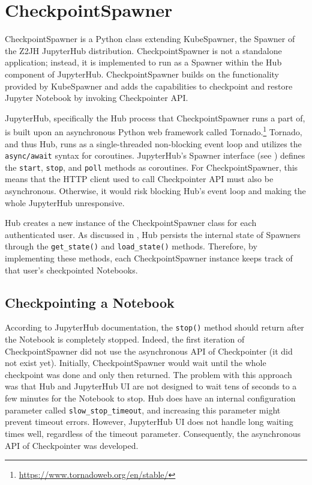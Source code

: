 \documentclass[
  digital,     %
  oneside,     %
  nosansbold,  %
  nocolorbold, %
  lof,         %
  nolot,         %
]{fithesis4}
\begin{document}
\chapter{CheckpointSpawner}
\label{chap:checkpoint_spawner}

CheckpointSpawner is a Python class extending KubeSpawner, the Spawner of the Z2JH JupyterHub distribution. CheckpointSpawner is not a standalone application; instead, it is implemented to run as a Spawner within the Hub component of JupyterHub. CheckpointSpaw\-ner builds on the functionality provided by KubeSpawner and adds the capabilities to checkpoint and restore Jupyter Notebook by invoking Checkpointer API. 

JupyterHub, specifically the Hub process that CheckpointSpawner runs a part of, is built upon an asynchronous Python web framework called Tornado.\footnote{\url{https://www.tornadoweb.org/en/stable/}} Tornado, and thus Hub, runs as a single-threaded non-blocking event loop and utilizes the \texttt{async/await} syntax for coroutines. JupyterHub's Spawner interface (see ) defines the \texttt{start}, \texttt{stop}, and \texttt{poll} methods as coroutines. For CheckpointSpawner, this means that the HTTP client used to call Checkpointer API must also be asynchronous. Otherwise, it would risk blocking Hub's event loop and making the whole JupyterHub unresponsive.

Hub creates a new instance of the CheckpointSpawner class for each authenticated user. As discussed in , Hub persists the internal state of Spawners through the \texttt{get\_state()} and \texttt{load\_state()} methods. Therefore, by implementing these methods, each CheckpointSpawner instance keeps track of that user's checkpointed Notebooks.


\section{Checkpointing a Notebook}
According to JupyterHub documentation, the \texttt{stop()} method should return after the Notebook is completely stopped. Indeed, the first iteration of CheckpointSpawner did not use the asynchronous API of Checkpointer (it did not exist yet). Initially, CheckpointSpawner would wait until the whole checkpoint was done and only then returned. The problem with this approach was that Hub and JupyterHub UI are not designed to wait tens of seconds to a few minutes for the Notebook to stop. Hub does have an internal configuration parameter called \texttt{slow\_stop\_timeout}, and increasing this parameter might prevent timeout errors. However, JupyterHub UI does not handle long waiting times well, regardless of the timeout parameter. Consequently, the asynchronous API of Checkpointer was developed.
\end{document}
